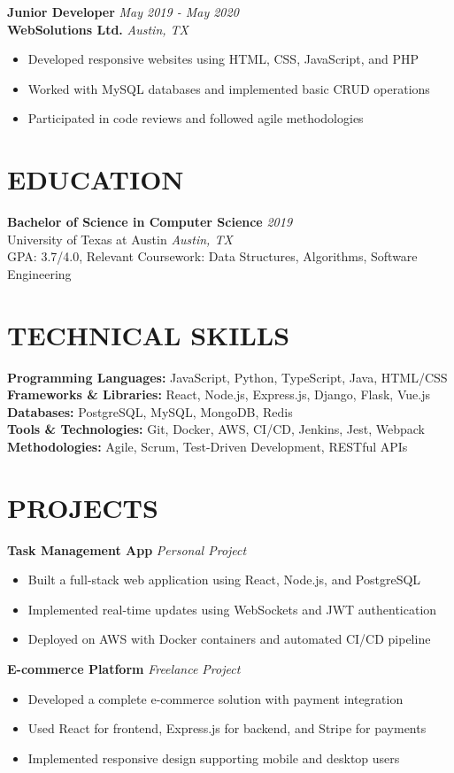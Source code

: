 \documentclass[11pt,a4paper]{article}
\begin{document}
\textbf{Junior Developer} \hfill \textit{May 2019 - May 2020}\\
\textbf{WebSolutions Ltd.} \hfill \textit{Austin, TX}
\begin{itemize}
\item Developed responsive websites using HTML, CSS, JavaScript, and PHP
\item Worked with MySQL databases and implemented basic CRUD operations
\item Participated in code reviews and followed agile methodologies
\end{itemize}

\section{EDUCATION}

\textbf{Bachelor of Science in Computer Science} \hfill \textit{2019}\\
University of Texas at Austin \hfill \textit{Austin, TX}\\
GPA: 3.7/4.0, Relevant Coursework: Data Structures, Algorithms, Software Engineering

\section{TECHNICAL SKILLS}

\textbf{Programming Languages:} JavaScript, Python, TypeScript, Java, HTML/CSS\\
\textbf{Frameworks \& Libraries:} React, Node.js, Express.js, Django, Flask, Vue.js\\
\textbf{Databases:} PostgreSQL, MySQL, MongoDB, Redis\\
\textbf{Tools \& Technologies:} Git, Docker, AWS, CI/CD, Jenkins, Jest, Webpack\\
\textbf{Methodologies:} Agile, Scrum, Test-Driven Development, RESTful APIs

\section{PROJECTS}

\textbf{Task Management App} \hfill \textit{Personal Project}
\begin{itemize}
\item Built a full-stack web application using React, Node.js, and PostgreSQL
\item Implemented real-time updates using WebSockets and JWT authentication
\item Deployed on AWS with Docker containers and automated CI/CD pipeline
\end{itemize}

\textbf{E-commerce Platform} \hfill \textit{Freelance Project}
\begin{itemize}
\item Developed a complete e-commerce solution with payment integration
\item Used React for frontend, Express.js for backend, and Stripe for payments
\item Implemented responsive design supporting mobile and desktop users
\end{itemize}
\end{document}
